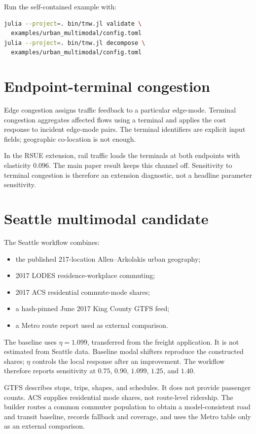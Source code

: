 Run the self-contained example with:
\begin{lstlisting}[language=bash]
julia --project=. bin/tnw.jl validate \
  examples/urban_multimodal/config.toml
julia --project=. bin/tnw.jl decompose \
  examples/urban_multimodal/config.toml
\end{lstlisting}

\section{Endpoint-terminal congestion}

Edge congestion assigns traffic feedback to a particular edge-mode. Terminal
congestion aggregates affected flows using a terminal and applies the cost
response to incident edge-mode pairs. The terminal identifiers are explicit
input fields; geographic co-location is not enough.

In the RSUE extension, rail traffic loads the terminals at both endpoints with
elasticity \(0.096\). The main paper result keeps this channel off. Sensitivity
to terminal congestion is therefore an extension diagnostic, not a headline
parameter sensitivity.

\section{Seattle multimodal candidate}

The Seattle workflow combines:
\begin{itemize}
  \item the published 217-location Allen--Arkolakis urban geography;
  \item 2017 LODES residence-workplace commuting;
  \item 2017 ACS residential commute-mode shares;
  \item a hash-pinned June 2017 King County GTFS feed;
  \item a Metro route report used as external comparison.
\end{itemize}

The baseline uses \(\eta=1.099\), transferred from the freight application.
It is not estimated from Seattle data. Baseline modal shifters reproduce the
constructed shares; \(\eta\) controls the local response after an improvement.
The workflow therefore reports sensitivity at \(0.75\), \(0.90\), \(1.099\),
\(1.25\), and \(1.40\).

GTFS describes stops, trips, shapes, and schedules. It does not provide
passenger counts. ACS supplies residential mode shares, not route-level
ridership. The builder routes a common commuter population to obtain a
model-consistent road and transit baseline, records fallback and coverage, and
uses the Metro table only as an external comparison.

